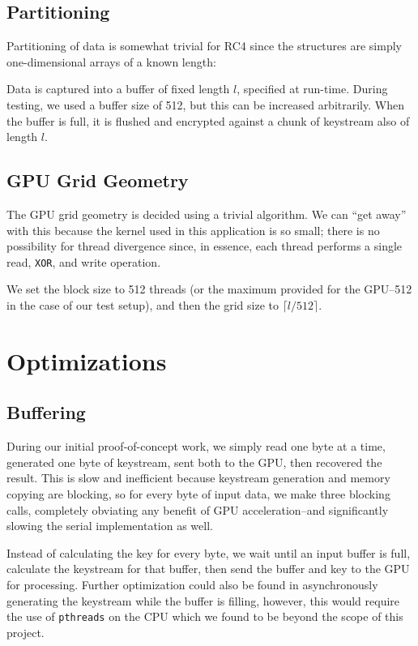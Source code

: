 \documentclass[twocolumn]{article}
\begin{document}
  \subsection{Partitioning}
  Partitioning of data is somewhat trivial for RC4 since the structures are simply one-dimensional arrays of a known length:
  
  Data is captured into a buffer of fixed length $l$, specified at run-time. During testing, we used a buffer size of 512, but this can be increased arbitrarily. When the buffer is full, it is flushed and encrypted against a chunk of keystream also of length $l$.
  
  
  \subsection{GPU Grid Geometry}
  The GPU grid geometry is decided using a trivial algorithm. We can ``get away'' with this because the kernel used in this application is so small; there is no possibility for thread divergence since, in essence, each thread performs a single read, \texttt{XOR}, and write operation.
  
  We set the block size to 512 threads (or the maximum provided for the GPU--512 in the case of our test setup), and then the grid size to $\lceil l/512 \rceil$.
  
  
  \section{Optimizations}
  \subsection{Buffering}
  During our initial proof-of-concept work, we simply read one byte at a time, generated one byte of keystream, sent both to the GPU, then recovered the result. This is slow and inefficient because keystream generation and memory copying are blocking, so for every byte of input data, we make three blocking calls, completely obviating any benefit of GPU acceleration--and significantly slowing the serial implementation as well.
  
  Instead of calculating the key for every byte, we wait until an input buffer is full, calculate the keystream for that buffer, then send the buffer and key to the GPU for processing. Further optimization could also be found in asynchronously generating the keystream while the buffer is filling, however, this would require the use of \texttt{pthreads} on the CPU which we found to be beyond the scope of this project.
  
\end{document}
